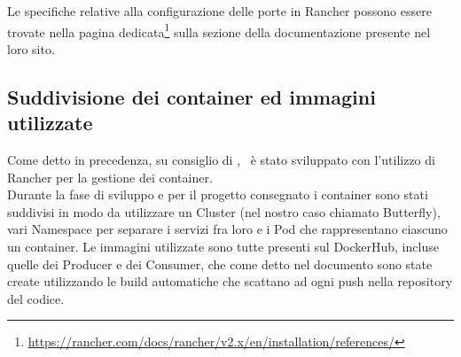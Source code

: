 Le specifiche relative alla configurazione delle porte in Rancher possono essere trovate nella pagina dedicata\footnote{\url{https://rancher.com/docs/rancher/v2.x/en/installation/references/}} sulla sezione della documentazione presente nel loro sito.

\subsection{Suddivisione dei container ed immagini utilizzate}
Come detto in precedenza, su consiglio di \II, \progetto\ è stato sviluppato con l'utilizzo di Rancher per la gestione dei container.\\
Durante la fase di sviluppo e per il progetto consegnato i container sono stati suddivisi in modo da utilizzare un Cluster (nel nostro caso chiamato Butterfly), vari Namespace per separare i servizi fra loro e i Pod che rappresentano ciascuno un container.
Le immagini utilizzate sono tutte presenti sul DockerHub, incluse quelle dei Producer e dei Consumer, che come detto nel documento \NdPd sono state create utilizzando le build automatiche che scattano ad ogni push nella repository del codice.

